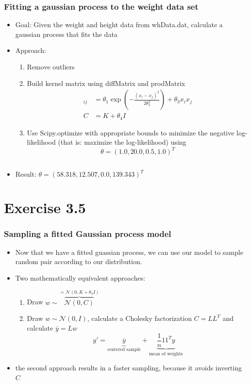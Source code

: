 \documentclass[10pt,aspectratio=169,handout]{beamer}
\begin{document}
\begin{frame}
    \frametitle{Fitting a gaussian process to the weight data set}

    \begin{itemize}
        \item Goal: Given the weight and height data from whData.dat, calculate a gaussian process that fits the data
        \item Approach:
            \begin{enumerate}
                \item Remove outliers
                \item Build kernel matrix using  diffMatrix and prodMatrix 
                \begin{align*}
                    [K]_{ij} &= \theta_1\exp\left(-\frac{(x_i-x_j)^2}{2\theta_2^2}\right)+\theta_3 x_ix_j \\
                    C& = K + \theta_4 I
                \end{align*}
                \item Use Scipy.optimize with appropriate bounds to minimize the negative log-likelihood (that is: maximize the log-likelihood)
                using \[\theta=(1.0, 20.0, 0.5, 1.0)^T\]
            \end{enumerate}
            \inputminted[bgcolor=LightGray,fontsize=\small]{python}{code/minimize_nll.py}
        \item Result: $\theta=(58.318, 12.507, 0.0, 139.343)^T$
    \end{itemize}

\end{frame}

\section{Exercise 3.5}

\begin{frame}
    \frametitle{Sampling a fitted Gaussian process model}

    \begin{itemize}
        \item Now that we have a fitted guassian process, we can use our model 
        to sample random pair according to our distribution.
        \item Two mathematically equivalent approaches:
        \begin{enumerate}
            \item Draw $w\sim \overbrace{\mathcal{N}(0,C)}^{=\mathcal{N}(0,K+\theta_4 I)}$
            \item Draw $w\sim \mathcal{N}(0,I)$, calculate a Cholesky factorization $C=LL^T$ and calculate $\overline{y}=Lw$
                \[y'=\underbrace{\overline{y}}_{\text{centered sample}}+\underbrace{\frac{1}{n}11^Ty}_{\text{mean of weights}}\]
        \end{enumerate}
        \item the second approach results in a faster sampling, because it avoids inverting $C$
    \end{itemize}    

\end{frame}
\end{document}
